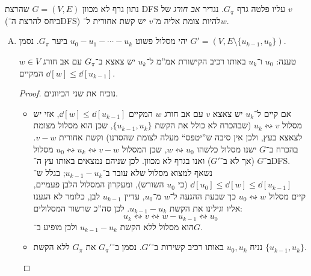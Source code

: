 \documentclass[]{../../../../tex/classes/homework}
\newcommand\squigd{\leftrightsquigarrow}
\begin{document}
	\section{}
	נתון גרף לא מכוון $G = (V, E)$ שהרצת DFS עליו פלטה גרף $G_{\pi}$. נגדיר \textit{אב חורג} של $v$ (ביחס להרצת ה־DFS) להיות צומת אליה מ־$v$ יש קשת אחורית ל־$w$. 
	\begin{enumerate}[(A)]
		\item יהי מסלול פשוט $u_0 - u_1 - \cdots - u_k$ ביער $G_\pi$. נסמן $G' = (V, E \setminus \{u_{k - 1}, u_k\})$. 
		
		טענה: $u_0$ ו־$u_k$ באותו רכיב הקישורת אמ''מ ל־$u_k$ יש צאצא ב־$G_\pi$ עם אב חורג $w \in V$ המקיים $\dd[w] \le \dd[u_{k - 1}]$. 
		\begin{proof}
			נוכיח את שני הכיוונים. 
			\begin{itemize}
				\item[$\implies$]אם קיים ל־$u_k$ יש צאצא $v$ עם אב חורג $w$ המקיים $\dd[w] \le \dd[u_{k - 1}]$, אזי יש מסלול $u_k \squigd v $ (שבהכרח לא כולל את הקשת $\{u_{k - 1}, u_k\}$, שכן הוא מסלול מצומת לצאצא בעץ, ולכן אין סיבה ש''יטפס`` מעלה לצומת שהסרנו) וקשת אחורית $v - w$. בהכרח ב־$G$ ישנו מסלול כלשהו $w \squigd u_0$, שכן המסלול $u_0 \squigd u_k \squigd v - w$ מסלול ב־$G$ (אך לא ב־$G'$) ואנו בגרף לא מכוון. לכן שניהם נמצאים באותו עץ ה־DFS. נשאף למצוא מסלול שלא עובר ב־$u_{k - 1} - u_k$; בגלל ש־$\dd[u_0] \le \dd[w] \le \dd[u_{k - 1}]$ (כי $u_0$ השורש), ומעקרון המסלול הלבן פעמיים, קיים מסלול $u_0 \squigd w$ כך שבעת ההגעה ל־$w$ מ־$u_0$, עדיין $u_{k - 1}$ לבן, כלומר לא הגענו אליו וגילינו את הקשת $u_{k - 1} - u_k$. לכן סה''כ שרשור המסלולים: 
				\[ u_k \squigd v \squigd w - u_{k - 1} \squigd u_0 \]
				הוא מסלול ללא הקשת $u_{k - 1} - u_k$ ולכן מופיע ב־$G$. 
				\item[$\impliedby$]נניח $u_0, u_k$ באותו רכיב קשירות ב־$G'$. נסמן ב־$G_\pi'$ את $G_\pi$ ללא הקשת $\{u_{k - 1}, u_k\}$. 
				

\end{itemize}
\end{proof}
\end{enumerate}
\end{document}
